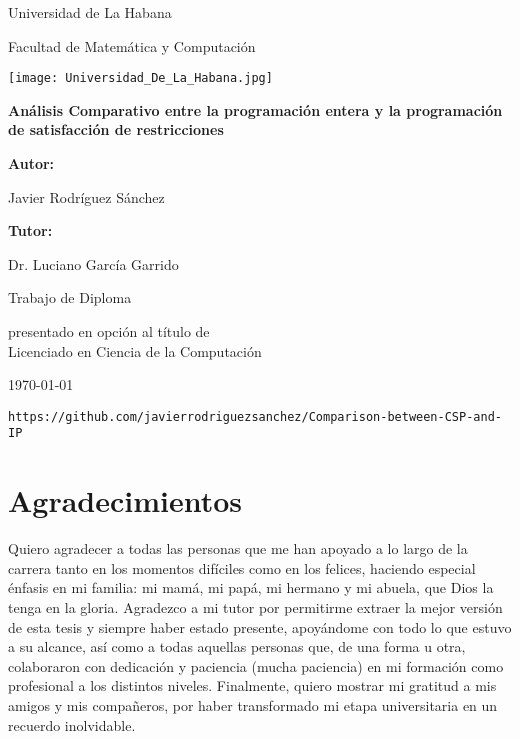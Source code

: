 \documentclass[12pt]{report}
\begin{document}
%
\begin{titlepage}
    \centering
    {\Large Universidad de La Habana \par}
    {\large Facultad de Matemática y Computación \par}
    \vspace{1cm}
    \texttt{[image: Universidad\_De\_La\_Habana.jpg]} %
    \vspace{1cm}
    
    {\bfseries\LARGE Análisis Comparativo entre la programación entera y la programación de satisfacción de restricciones \par}
    \vspace{1cm}
    
    {\large \textbf{Autor:} \par}
    {\large Javier Rodríguez Sánchez \par}
    \vspace{1cm}
    
    {\large \textbf{Tutor:} \par}
    {\large Dr. Luciano García Garrido \par}
    \vspace{1cm}
    
    {\large Trabajo de Diploma \par}
    {\small presentado en opción al título de \\ Licenciado en Ciencia de la Computación \par}
    \vspace{1cm}
    
    {\large \today \par}
    
    \vfill
    
    {\small \texttt{https://github.com/javierrodriguezsanchez/Comparison-between-CSP-and-IP}}
\end{titlepage}


\section*{Agradecimientos}
Quiero agradecer a todas las personas que me han apoyado a lo largo de la carrera tanto en los momentos difíciles como en los felices, haciendo especial énfasis en mi familia: mi mamá, mi papá, mi hermano y mi abuela, que Dios la tenga en la gloria. Agradezco a mi tutor por permitirme extraer la mejor versión de esta tesis y siempre haber estado presente, apoyándome con todo lo que estuvo a su alcance, así como a todas aquellas personas que, de una forma u otra, colaboraron con dedicación y paciencia (mucha paciencia) en mi formación como profesional a los distintos niveles. Finalmente, quiero mostrar mi gratitud a mis amigos y mis compañeros, por haber transformado mi etapa universitaria en un recuerdo inolvidable.
\end{document}
